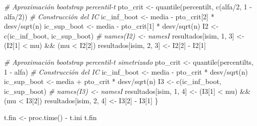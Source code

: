 \documentclass[
]{book}
\newenvironment{Shaded}{\begin{snugshade}}{\end{snugshade}}
\newcommand{\CommentTok}[1]{\textcolor[rgb]{0.56,0.35,0.01}{\textit{#1}}}
\newcommand{\DecValTok}[1]{\textcolor[rgb]{0.00,0.00,0.81}{#1}}
\newcommand{\FunctionTok}[1]{\textcolor[rgb]{0.00,0.00,0.00}{#1}}
\newcommand{\NormalTok}[1]{#1}
\newcommand{\OtherTok}[1]{\textcolor[rgb]{0.56,0.35,0.01}{#1}}
\newcommand{\SpecialCharTok}[1]{\textcolor[rgb]{0.00,0.00,0.00}{#1}}
\theoremstyle{break}
\theoremstyle{definition}
\theoremstyle{definition}
\theoremstyle{definition}
\theoremstyle{definition}
\theoremstyle{remark}
\begin{document}
\begin{Shaded}
\begin{Highlighting}[]
    \CommentTok{\# Aproximación bootstrap percentil{-}t}
\NormalTok{    pto\_crit }\OtherTok{\textless{}{-}} \FunctionTok{quantile}\NormalTok{(percentilt, }\FunctionTok{c}\NormalTok{(alfa}\SpecialCharTok{/}\DecValTok{2}\NormalTok{, }\DecValTok{1} \SpecialCharTok{{-}}\NormalTok{ alfa}\SpecialCharTok{/}\DecValTok{2}\NormalTok{))}
    \CommentTok{\# Construcción del IC}
\NormalTok{    ic\_inf\_boot }\OtherTok{\textless{}{-}}\NormalTok{ media }\SpecialCharTok{{-}}\NormalTok{ pto\_crit[}\DecValTok{2}\NormalTok{] }\SpecialCharTok{*}\NormalTok{ desv}\SpecialCharTok{/}\FunctionTok{sqrt}\NormalTok{(n)}
\NormalTok{    ic\_sup\_boot }\OtherTok{\textless{}{-}}\NormalTok{ media }\SpecialCharTok{{-}}\NormalTok{ pto\_crit[}\DecValTok{1}\NormalTok{] }\SpecialCharTok{*}\NormalTok{ desv}\SpecialCharTok{/}\FunctionTok{sqrt}\NormalTok{(n)}
\NormalTok{    I2 }\OtherTok{\textless{}{-}} \FunctionTok{c}\NormalTok{(ic\_inf\_boot, ic\_sup\_boot)}
    \CommentTok{\# names(I2) \textless{}{-} namesI}
\NormalTok{    resultados[isim, }\DecValTok{1}\NormalTok{, }\DecValTok{3}\NormalTok{] }\OtherTok{\textless{}{-}}\NormalTok{ (I2[}\DecValTok{1}\NormalTok{] }\SpecialCharTok{\textless{}}\NormalTok{ mu) }\SpecialCharTok{\&\&}\NormalTok{ (mu }\SpecialCharTok{\textless{}}\NormalTok{ I2[}\DecValTok{2}\NormalTok{])}
\NormalTok{    resultados[isim, }\DecValTok{2}\NormalTok{, }\DecValTok{3}\NormalTok{] }\OtherTok{\textless{}{-}}\NormalTok{ I2[}\DecValTok{2}\NormalTok{] }\SpecialCharTok{{-}}\NormalTok{ I2[}\DecValTok{1}\NormalTok{]}
    
    \CommentTok{\# Aproximación bootstrap percentil{-}t simetrizado}
\NormalTok{    pto\_crit }\OtherTok{\textless{}{-}} \FunctionTok{quantile}\NormalTok{(percentilts, }\DecValTok{1} \SpecialCharTok{{-}}\NormalTok{ alfa)}
    \CommentTok{\# Construcción del IC}
\NormalTok{    ic\_inf\_boot }\OtherTok{\textless{}{-}}\NormalTok{ media }\SpecialCharTok{{-}}\NormalTok{ pto\_crit }\SpecialCharTok{*}\NormalTok{ desv}\SpecialCharTok{/}\FunctionTok{sqrt}\NormalTok{(n)}
\NormalTok{    ic\_sup\_boot }\OtherTok{\textless{}{-}}\NormalTok{ media }\SpecialCharTok{+}\NormalTok{ pto\_crit }\SpecialCharTok{*}\NormalTok{ desv}\SpecialCharTok{/}\FunctionTok{sqrt}\NormalTok{(n)}
\NormalTok{    I3 }\OtherTok{\textless{}{-}} \FunctionTok{c}\NormalTok{(ic\_inf\_boot, ic\_sup\_boot)}
    \CommentTok{\# names(I3) \textless{}{-} namesI}
\NormalTok{    resultados[isim, }\DecValTok{1}\NormalTok{, }\DecValTok{4}\NormalTok{] }\OtherTok{\textless{}{-}}\NormalTok{ (I3[}\DecValTok{1}\NormalTok{] }\SpecialCharTok{\textless{}}\NormalTok{ mu) }\SpecialCharTok{\&\&}\NormalTok{ (mu }\SpecialCharTok{\textless{}}\NormalTok{ I3[}\DecValTok{2}\NormalTok{])}
\NormalTok{    resultados[isim, }\DecValTok{2}\NormalTok{, }\DecValTok{4}\NormalTok{] }\OtherTok{\textless{}{-}}\NormalTok{ I3[}\DecValTok{2}\NormalTok{] }\SpecialCharTok{{-}}\NormalTok{ I3[}\DecValTok{1}\NormalTok{]}
\NormalTok{\}}

\NormalTok{t.fin }\OtherTok{\textless{}{-}} \FunctionTok{proc.time}\NormalTok{() }\SpecialCharTok{{-}}\NormalTok{ t.ini}
\NormalTok{t.fin}
\end{Highlighting}
\end{Shaded}
\end{document}
